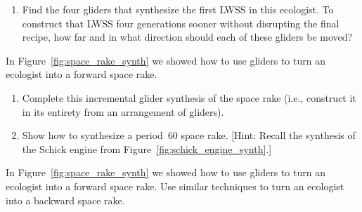 \begin{multicols}{2}
\begin{problem}
\begin{enumerate}[label=\bf\color{ocre}(\alph*)]
			
			\item Find the four gliders that synthesize the first LWSS in this ecologist. To construct that LWSS four generations sooner without disrupting the final recipe, how far and in what direction should each of these gliders be moved?
			
			
		\end{enumerate}
	\end{problem}
	
	
	\mfilbreak
	
	
	\begin{problemstar}\label{exer:make_space_rake_synth}
		In Figure~\ref{fig:space_rake_synth} we showed how to use gliders to turn an ecologist into a forward space rake.
		\begin{enumerate}[label=\bf\color{ocre}(\alph*)]
			\item Complete this incremental glider synthesis of the space rake (i.e., construct it in its entirety from an arrangement of gliders).
			
			\item Show how to synthesize a period~$60$ space rake. [Hint: Recall the synthesis of the Schick engine from Figure~\ref{fig:schick_engine_synth}.]
		\end{enumerate}
	\end{problemstar}
	
	
	\mfilbreak
	
	
	\begin{problemstar}\label{exer:space_rake_synth}
		In Figure~\ref{fig:space_rake_synth} we showed how to use gliders to turn an ecologist into a forward space rake. Use similar techniques to turn an ecologist into a backward space rake.
	\end{problemstar}
	

\end{multicols}
